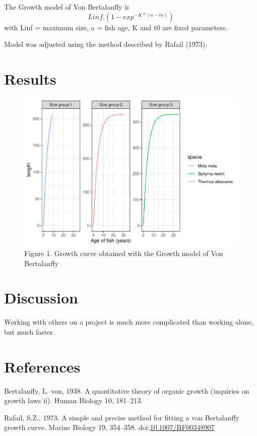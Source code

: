 \documentclass[]{elsarticle} %
\begin{document}
The Growth model of Von Bertalanffy is \[Linf.(1-exp^{-K*(a-to)})\] with
Linf = maximum size, a = fish age, K and t0 are fixed parameters.

Model was adjusted using the method described by Rafail (1973).

\hypertarget{results}{%
\section{Results}\label{results}}

\begin{figure}
\centering
\includegraphics{ElsevierRBertalanffyPackage_files/figure-latex/unnamed-chunk-1-1.pdf}
\caption{Figure 1. Growth curve obtained with the Growth model of Von
Bertalanffy}
\end{figure}

\hypertarget{discussion}{%
\section{Discussion}\label{discussion}}

Working with others on a project is much more complicated than working
alone, but much faster.

\hypertarget{references}{%
\section*{References}\label{references}}

\hypertarget{refs}{}
\leavevmode\hypertarget{ref-Bertalanffy1938}{}%
Bertalanffy, L. von, 1938. A quantitative theory of organic growth
(inquiries on growth laws ii). Human Biology 10, 181--213.

\leavevmode\hypertarget{ref-rafail_simple_1973}{}%
Rafail, S.Z., 1973. A simple and precise method for fitting a von
Bertalanffy growth curve. Marine Biology 19, 354--358.
doi:\href{https://doi.org/10.1007/BF00348907}{10.1007/BF00348907}
\end{document}
